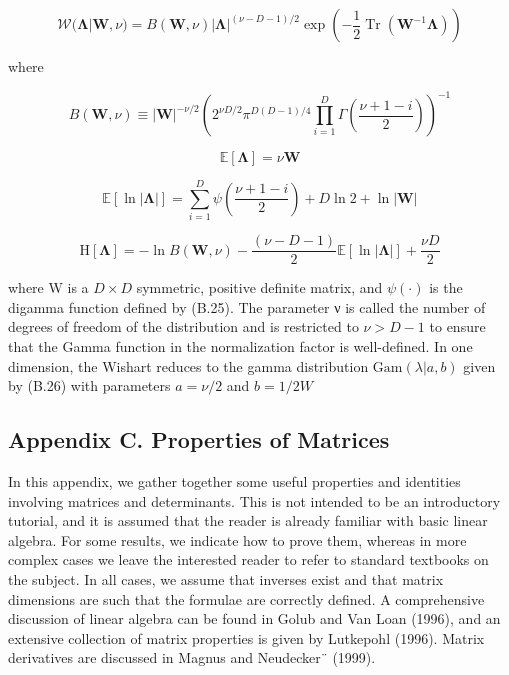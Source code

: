 \documentclass[
  10
]{article}
\begin{document}
\[
\mathcal {W} (\boldsymbol {\Lambda} | \mathbf {W}, \nu) = B (\mathbf {W}, \nu) | \boldsymbol {\Lambda} | ^ {(\nu - D - 1) / 2} \exp \left(- \frac {1}{2} \operatorname{Tr} \left(\mathbf {W} ^ {- 1} \boldsymbol {\Lambda}\right)\right)\tag{B.78}
\]

where

\[
B (\mathbf {W}, \nu) \equiv | \mathbf {W} | ^ {- \nu / 2} \left(2 ^ {\nu D / 2} \pi^ {D (D - 1) / 4} \prod_ {i = 1} ^ {D} \Gamma \left(\frac {\nu + 1 - i}{2}\right)\right) ^ {- 1}\tag{B.79}
\]

\[
\mathbb {E} [ \boldsymbol {\Lambda} ] = \nu \mathbf {W}\tag{B.80}
\]

\[
\mathbb {E} \left[ \ln | \boldsymbol {\Lambda} | \right] = \sum_ {i = 1} ^ {D} \psi \left(\frac {\nu + 1 - i}{2}\right) + D \ln 2 + \ln | \mathbf {W} |\tag{B.81}
\]

\[
\mathrm{H} [ \boldsymbol {\Lambda} ] = - \ln B (\mathbf {W}, \nu) - \frac {(\nu - D - 1)}{2} \mathbb {E} \left[ \ln | \boldsymbol {\Lambda} | \right] + \frac {\nu D}{2}\tag{B.82}
\]

where W is a \(D \times D\) symmetric, positive definite matrix, and
\(\psi ( \cdot )\) is the digamma function defined by (B.25). The
parameter ν is called the number of degrees of freedom of the
distribution and is restricted to \(\nu > D - 1\) to ensure that the
Gamma function in the normalization factor is well-defined. In one
dimension, the Wishart reduces to the gamma distribution
\({ \mathrm { G a m } } ( \lambda | a , b )\) given by (B.26) with
parameters \(a = \nu / 2\) and \(b = 1 / 2 W\)

\subsection{Appendix C. Properties of
Matrices}\label{appendix-c.-properties-of-matrices}

In this appendix, we gather together some useful properties and
identities involving matrices and determinants. This is not intended to
be an introductory tutorial, and it is assumed that the reader is
already familiar with basic linear algebra. For some results, we
indicate how to prove them, whereas in more complex cases we leave the
interested reader to refer to standard textbooks on the subject. In all
cases, we assume that inverses exist and that matrix dimensions are such
that the formulae are correctly defined. A comprehensive discussion of
linear algebra can be found in Golub and Van Loan (1996), and an
extensive collection of matrix properties is given by Lutkepohl (1996).
Matrix derivatives are discussed in Magnus and Neudecker¨ (1999).
\end{document}
